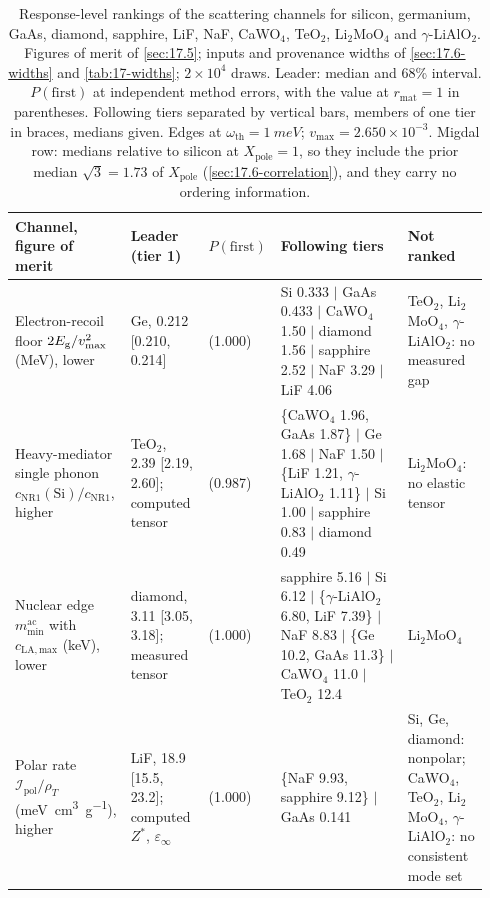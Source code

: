 \begin{table}[tbp]
  \caption{Response-level rankings of the scattering channels for silicon, germanium, GaAs, diamond, sapphire, LiF, NaF, CaWO$_4$, TeO$_2$, Li$_2$MoO$_4$ and $\gamma$-LiAlO$_2$. Figures of merit of \cref{sec:17.5}; inputs and provenance widths of \cref{sec:17.6-widths} and \cref{tab:17-widths}; $2\times10^4$ draws. Leader: median and 68\% interval. $P(\mathrm{first})$ at independent method errors, with the value at $r_{\mathrm{mat}} = 1$ in parentheses. Following tiers separated by vertical bars, members of one tier in braces, medians given. Edges at $\omega_{\mathrm{th}} = \SI{1}{meV}$; $v_{\mathrm{max}} = 2.650\times10^{-3}$. Migdal row: medians relative to silicon at $X_{\mathrm{pole}} = 1$, so they include the prior median $\sqrt3 = 1.73$ of $X_{\mathrm{pole}}$ (\cref{sec:17.6-correlation}), and they carry no ordering information.}
  \label{tab:17-rank}
  \centering\scriptsize\setlength{\tabcolsep}{3pt}
  \begin{tabular}{@{}>{\raggedright\arraybackslash}p{0.17\linewidth}>{\raggedright\arraybackslash}p{0.17\linewidth}>{\raggedright\arraybackslash}p{0.09\linewidth}>{\raggedright\arraybackslash}p{0.33\linewidth}>{\raggedright\arraybackslash}p{0.18\linewidth}@{}}
    \toprule
    Channel, figure of merit & Leader (tier 1) & $P(\mathrm{first})$ & Following tiers & Not ranked \\
    \midrule
    Electron-recoil floor $2E_{\mathrm{g}}/v_{\mathrm{max}}^2$ (MeV), lower & Ge, 0.212 [0.210, 0.214] & 1.000 (1.000) & Si 0.333 $|$ GaAs 0.433 $|$ CaWO$_4$ 1.50 $|$ diamond 1.56 $|$ sapphire 2.52 $|$ NaF 3.29 $|$ LiF 4.06 & TeO$_2$, Li$_2$MoO$_4$, $\gamma$-LiAlO$_2$: no measured gap \\
    Heavy-mediator single phonon $c_{\mathrm{NR1}}(\mathrm{Si})/c_{\mathrm{NR1}}$, higher & TeO$_2$, 2.39 [2.19, 2.60]; computed tensor & 0.968 (0.987) & \{CaWO$_4$ 1.96, GaAs 1.87\} $|$ Ge 1.68 $|$ NaF 1.50 $|$ \{LiF 1.21, $\gamma$-LiAlO$_2$ 1.11\} $|$ Si 1.00 $|$ sapphire 0.83 $|$ diamond 0.49 & Li$_2$MoO$_4$: no elastic tensor \\
    Nuclear edge $m_{\mathrm{min}}^{\mathrm{ac}}$ with $c_{\mathrm{LA,max}}$ (keV), lower & diamond, 3.11 [3.05, 3.18]; measured tensor & 1.000 (1.000) & sapphire 5.16 $|$ Si 6.12 $|$ \{$\gamma$-LiAlO$_2$ 6.80, LiF 7.39\} $|$ NaF 8.83 $|$ \{Ge 10.2, GaAs 11.3\} $|$ CaWO$_4$ 11.0 $|$ TeO$_2$ 12.4 & Li$_2$MoO$_4$ \\
    Polar rate $\mathcal{I}_{\mathrm{pol}}/\rho_T$ (\si{meV.cm^3.g^{-1}}), higher & LiF, 18.9 [15.5, 23.2]; computed $Z^*$, $\varepsilon_\infty$ & 0.987 (1.000) & \{NaF 9.93, sapphire 9.12\} $|$ GaAs 0.141 & Si, Ge, diamond: nonpolar; CaWO$_4$, TeO$_2$, Li$_2$MoO$_4$, $\gamma$-LiAlO$_2$: no consistent mode set \\

\end{tabular}
\end{table}
